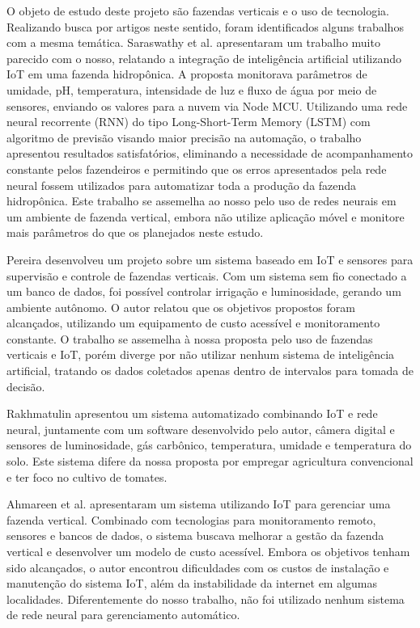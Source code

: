 O objeto de estudo deste projeto são fazendas verticais e o uso de tecnologia. Realizando busca por artigos neste sentido, foram identificados alguns trabalhos com a mesma temática. Saraswathy et al. \cite{saraswathy2020} apresentaram um trabalho muito parecido com o nosso, relatando a integração de inteligência artificial utilizando IoT em uma fazenda hidropônica. A proposta monitorava parâmetros de umidade, pH, temperatura, intensidade de luz e fluxo de água por meio de sensores, enviando os valores para a nuvem via Node MCU. Utilizando uma rede neural recorrente (RNN) do tipo Long-Short-Term Memory (LSTM) com algoritmo de previsão visando maior precisão na automação, o trabalho apresentou resultados satisfatórios, eliminando a necessidade de acompanhamento constante pelos fazendeiros e permitindo que os erros apresentados pela rede neural fossem utilizados para automatizar toda a produção da fazenda hidropônica. Este trabalho se assemelha ao nosso pelo uso de redes neurais em um ambiente de fazenda vertical, embora não utilize aplicação móvel e monitore mais parâmetros do que os planejados neste estudo.

Pereira \cite{sousa2023} desenvolveu um projeto sobre um sistema baseado em IoT e sensores para supervisão e controle de fazendas verticais. Com um sistema sem fio conectado a um banco de dados, foi possível controlar irrigação e luminosidade, gerando um ambiente autônomo. O autor relatou que os objetivos propostos foram alcançados, utilizando um equipamento de custo acessível e monitoramento constante. O trabalho se assemelha à nossa proposta pelo uso de fazendas verticais e IoT, porém diverge por não utilizar nenhum sistema de inteligência artificial, tratando os dados coletados apenas dentro de intervalos para tomada de decisão.

Rakhmatulin \cite{rakhmatulin2021} apresentou um sistema automatizado combinando IoT e rede neural, juntamente com um software desenvolvido pelo autor, câmera digital e sensores de luminosidade, gás carbônico, temperatura, umidade e temperatura do solo. Este sistema difere da nossa proposta por empregar agricultura convencional e ter foco no cultivo de tomates.

Ahmareen et al. \cite{ahmareen2024} apresentaram um sistema utilizando IoT para gerenciar uma fazenda vertical. Combinado com tecnologias para monitoramento remoto, sensores e bancos de dados, o sistema buscava melhorar a gestão da fazenda vertical e desenvolver um modelo de custo acessível. Embora os objetivos tenham sido alcançados, o autor encontrou dificuldades com os custos de instalação e manutenção do sistema IoT, além da instabilidade da internet em algumas localidades. Diferentemente do nosso trabalho, não foi utilizado nenhum sistema de rede neural para gerenciamento automático.
